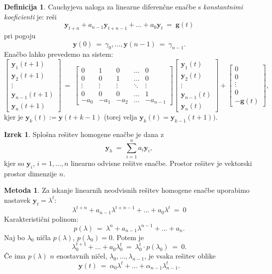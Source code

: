 \documentclass[11pt]{article}
\newcommand{\g}{\mathbf{g}}
\newcommand{\y}{\mathbf{y}}
\theoremstyle{definition}
\newtheorem{definicija}{Definicija}[section]
\theoremstyle{definition}
\theoremstyle{definition}
\newtheorem{izrek}{Izrek}[section]
\theoremstyle{definition}
\newtheorem{metoda}{Metoda}[section]
\begin{document}
\begin{definicija}

Cauchyjeva naloga za linearne diferenčne enačbe s \textit{konstantnimi koeficienti} je: reši
$$\y_{t+n} + a_{n-1}\y_{t+n-1} + \ldots + a_0\y_t ~=~ \g(t)$$
pri pogoju
$$\y(0) ~=~ \gamma_0,\ldots,\y(n-1) ~=~ \gamma_{n-1}.$$
Enačbo lahko prevedemo na sistem:
$$\begin{bmatrix}
\y_1(t+1) \\
\y_2(t+1) \\
\vdots \\
\y_{n-1}(t+1) \\
\y_{n}(t+1)
\end{bmatrix} ~=~ \begin{bmatrix}
0 & 1 & 0 & \ldots & 0 \\
0 & 0 & 1 & \ldots & 0 \\
\vdots & \vdots & \vdots & \ddots & \vdots \\
0 & 0 & 0 & \ldots & 1 \\
-a_0 & -a_1 & -a_2 & \ldots & -a_{n-1} 
\end{bmatrix} \begin{bmatrix}
\y_1(t) \\
\y_2(t) \\
\vdots \\
\y_{n-1}(t) \\
\y_n(t)
\end{bmatrix} + \begin{bmatrix}
0 \\
0 \\
\vdots \\
0 \\
-\g(t)
\end{bmatrix},$$
kjer je $\y_k(t) := \y(t+k-1)$ (torej velja $\y_k(t) = \y_{k-1}(t+1))$.

\end{definicija}
\vspace{0.5cm}

\begin{izrek}

Splošna rešitev homogene enačbe je dana z
$$\y_h ~=~ \sum_{i=1}^n a_i \y_i,$$
kjer so $\y_i$, $i=1,\ldots,n$ linearno odvisne rešitve enačbe. Prostor rešitev je vektorski prostor dimenzije $n.$

\end{izrek}
\vspace{0.5cm}

\begin{metoda}

Za iskanje linearnih neodvisnih rešitev homogene enačbe uporabimo nastavek $\y_t = \lambda^t$:
$$\lambda^{t+n} + a_{n-1}\lambda^{t+n-1} + \ldots + a_0\lambda^t ~=~ 0$$
Karakteristični polinom:
$$p(\lambda) ~=~ \lambda^n + a_{n-1}\lambda^{n-1} + \ldots + a_n.$$
Naj bo $\lambda_0$ ničla $p(\lambda)$, $p(\lambda_0) = 0$. Potem je
$$\lambda_0^{t+1} + \ldots + a_0\lambda_0^t ~=~ \lambda_0^t \cdot p(\lambda_0) ~=~ 0.$$
Če ima $p(\lambda)$ $n$ enostavnih ničel, $\lambda_0,\ldots,\lambda_{n-1}$, je vsaka rešitev oblike
$$\y(t) ~=~ \alpha_0\lambda^t + \ldots + \alpha_{n-1}\lambda_{n-1}^t.$$

\end{metoda}
\vspace{0.5cm}


\pagebreak

\end{document}
